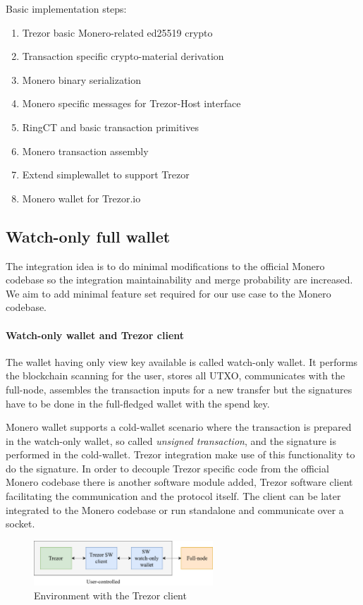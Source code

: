 \documentclass[]{article}
\begin{document}
\;
\noindent Basic implementation steps:
\begin{enumerate}
	\item Trezor basic Monero-related ed25519 crypto
	\item Transaction specific crypto-material derivation
	\item Monero binary serialization
	\item Monero specific messages for Trezor-Host interface
	\item RingCT and basic transaction primitives
	\item Monero transaction assembly
	\item Extend simplewallet to support Trezor
	\item Monero wallet for Trezor.io 
\end{enumerate}

\subsection{Watch-only full wallet}
The integration idea is to do minimal modifications to the official Monero codebase so the integration maintainability and merge probability are increased. We aim to add minimal feature set required for our use case to the Monero codebase. 

\paragraph{Watch-only wallet and Trezor client} 
The wallet having only view key available is called watch-only wallet. It performs the blockchain scanning for the user, stores all UTXO, communicates with the full-node, assembles the transaction inputs for a new transfer but the signatures have to be done in the full-fledged wallet with the spend key. 

Monero wallet supports a cold-wallet scenario where the transaction is prepared in the watch-only wallet, so called \emph{unsigned transaction}, and the signature is performed in the cold-wallet. Trezor integration make use of this functionality to do the signature. In order to decouple Trezor specific code from the official Monero codebase there is another software module added, Trezor software client facilitating the communication and the protocol itself. The client can be later integrated to the Monero codebase or run standalone and communicate over a socket.

\begin{figure}[H]
	\centering
	\includegraphics[width=0.6\textwidth, angle=0]{img/trezor-int.pdf}
	\caption{Environment with the Trezor client}
\end{figure}
\end{document}
